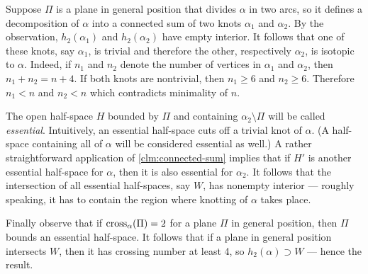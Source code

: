 Suppose $\Pi$ is a plane in general position that divides $\alpha$ in two arcs, so it defines a decomposition of $\alpha$ into a connected sum of two knots $\alpha_1$ and $\alpha_2$.
By the observation, $h_2(\alpha_1)$ and $h_2(\alpha_2)$ have empty interior.
It follows that one of these knots, say $\alpha_1$, is trivial and therefore the other, respectively $\alpha_2$, is isotopic to $\alpha$.
Indeed, if $n_1$ and $n_2$ denote the number of vertices in $\alpha_1$ and $\alpha_2$, then $n_1+n_2=n+4$. 
If both knots are nontrivial, then $n_1\ge 6$ and $n_2\ge 6$.
Therefore $n_1<n$ and $n_2<n$ which contradicts minimality of $n$.

The open half-space $H$ bounded by $\Pi$ and containing $\alpha_2\setminus\Pi$ will be called \emph{essential}. Intuitively, an essential half-space cuts off
a trivial knot of $\alpha$. (A half-space containing all of $\alpha$ will be considered essential as well.)
A rather straightforward application of \ref{clm:connected-sum} implies that if $H'$ is another essential half-space for $\alpha$, then it is also essential for $\alpha_2$.
It follows that the intersection of all essential half-spaces, say $W$, has nonempty interior --- roughly speaking, it has to contain the region where knotting of $\alpha$ takes place.

Finally observe that if $\mathop{\rm cross}\nolimits_\alpha(\Pi)=2$ for a plane $\Pi$ in general position, then $\Pi$ bounds an essential half-space. 
It follows that if a plane in general position intersects $W$, then it has  crossing number at least 4,
so $h_2(\alpha)\supset W$ --- hence the result.
\qeds

